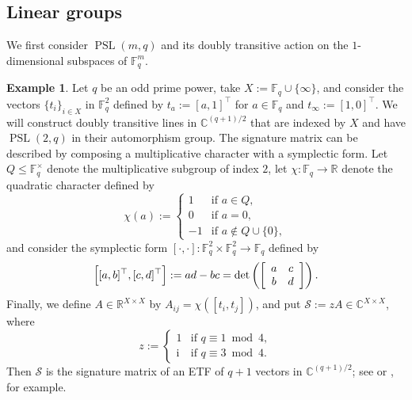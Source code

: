 \documentclass[11pt]{article}
\theoremstyle{definition}
\newtheorem{example}[theo]{Example}
\numberwithin{equation}{section}
\begin{document}
\subsection{Linear groups}
\label{subsec:linear}

We first consider $\operatorname{PSL}(m,q)$ and its doubly transitive action on the $1$-dimensional subspaces of $\mathbb{F}_q^m$.

\begin{example}
\label{ex.Paley conference}
Let $q$ be an odd prime power, take $X:=\mathbb{F}_q\cup\{\infty\}$, and consider the vectors $\{t_i\}_{i\in X}$ in $\mathbb{F}_q^2$ defined by $t_a:=[a,1]^\top$ for $a\in\mathbb{F}_q$
and $t_\infty:=[1,0]^\top$.
We will construct doubly transitive lines in $\mathbb{C}^{(q+1)/2}$ that are indexed by $X$ and have $\operatorname{PSL}(2,q)$ in their automorphism group.
The signature matrix can be described by composing a multiplicative character with a symplectic form.
Let $Q\leq\mathbb{F}_q^\times$ denote the multiplicative subgroup of index $2$, let $\chi\colon\mathbb{F}_q\to\mathbb{R}$ denote the quadratic character defined by
\[
\chi(a)
:=
\begin{cases}
1 & \text{if }a \in Q, \\
0 & \text{if }a = 0, \\
-1 & \text{if }a \not\in Q \cup\{0\},
\end{cases}
\]
and consider the symplectic form $[\cdot,\cdot]\colon\mathbb{F}_q^2\times\mathbb{F}_q^2\to\mathbb{F}_q$ defined by
\[
\Bigl[ [ a,b]^\top, [c,d]^\top \Bigr]:=ad-bc=\operatorname{det}\left(\left[\begin{array}{cc}a&c\\b&d\end{array}\right]\right).
\]
Finally, we define $A\in\mathbb{R}^{X\times X}$ by $A_{ij}=\chi([t_i,t_j])$, and put $\mathcal{S}:=z A\in\mathbb{C}^{X\times X}$, where
\[
z
:=
\begin{cases}
1 & \text{if } q \equiv 1 \bmod 4, \\
\mathrm{i} & \text{if } q \equiv 3 \bmod 4.
\end{cases}
\]
Then $\mathcal{S}$ is the signature matrix of an ETF of $q+1$ vectors in $\mathbb{C}^{(q+1)/2}$; see \cite{Renes:07} or \cite[p.~67]{Zauner:99}, for example.


\end{example}
\end{document}

